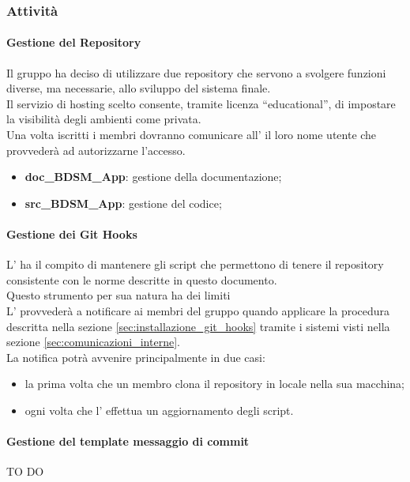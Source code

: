 		\subsubsection{Attività}
			\paragraph{Gestione del Repository}
			Il gruppo ha deciso di utilizzare due repository che servono a svolgere funzioni diverse, ma necessarie, allo sviluppo del sistema finale. \\
			Il servizio di hosting scelto consente, tramite licenza ``educational'', di impostare la visibilità degli ambienti come privata. \\
			Una volta iscritti i membri dovranno comunicare all'\roleAdministrator{} il loro nome utente che provvederà ad autorizzarne l'accesso.
				\begin{itemize}
					\item \textbf{doc\_BDSM\_App}: gestione della documentazione;
					\item \textbf{src\_BDSM\_App}: gestione del codice;
				\end{itemize}
			\paragraph{Gestione dei Git Hooks}
			L'\roleAdministrator{} ha il compito di mantenere gli script che permettono di tenere il repository consistente con le norme descritte in questo documento. \\
			Questo strumento per sua natura ha dei limiti \\
			L'\roleAdministrator{} provvederà a notificare ai membri del gruppo quando applicare la procedura descritta nella sezione \ref{sec:installazione_git_hooks} tramite i sistemi visti nella sezione \ref{sec:comunicazioni_interne}. \\
			La notifica potrà avvenire principalmente in due casi:
				\begin{itemize}
					\item la prima volta che un membro clona il repository in locale nella sua macchina;
					\item ogni volta che l'\roleAdministrator{} effettua un aggiornamento degli script.
				\end{itemize}
			\paragraph{Gestione del template messaggio di commit}
			TO DO
			
